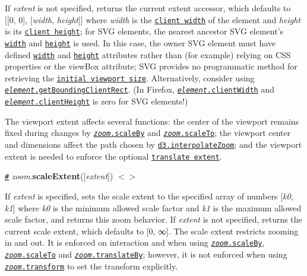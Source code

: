 If {\itshape extent} is not specified, returns the current extent accessor, which defaults to \mbox{[}\mbox{[}0, 0\mbox{]}, \mbox{[}{\itshape width}, {\itshape height}\mbox{]}\mbox{]} where {\itshape width} is the \href{https://developer.mozilla.org/en-US/docs/Web/API/Element/clientWidth}{\tt client width} of the element and {\itshape height} is its \href{https://developer.mozilla.org/en-US/docs/Web/API/Element/clientHeight}{\tt client height}; for S\+VG elements, the nearest ancestor S\+VG element’s \href{https://www.w3.org/TR/SVG/struct.html#SVGElementWidthAttribute}{\tt width} and \href{https://www.w3.org/TR/SVG/struct.html#SVGElementHeightAttribute}{\tt height} is used. In this case, the owner S\+VG element must have defined \href{https://www.w3.org/TR/SVG/struct.html#SVGElementWidthAttribute}{\tt width} and \href{https://www.w3.org/TR/SVG/struct.html#SVGElementHeightAttribute}{\tt height} attributes rather than (for example) relying on C\+SS properties or the view\+Box attribute; S\+VG provides no programmatic method for retrieving the \href{https://www.w3.org/TR/SVG/coords.html#ViewportSpace}{\tt initial viewport size}. Alternatively, consider using \href{https://developer.mozilla.org/en-US/docs/Web/API/Element/getBoundingClientRect}{\tt {\itshape element}.get\+Bounding\+Client\+Rect}. (In Firefox, \href{https://developer.mozilla.org/en-US/docs/Web/API/Element/clientWidth}{\tt {\itshape element}.client\+Width} and \href{https://developer.mozilla.org/en-US/docs/Web/API/Element/clientHeight}{\tt {\itshape element}.client\+Height} is zero for S\+VG elements!)

The viewport extent affects several functions\+: the center of the viewport remains fixed during changes by \href{#zoom_scaleBy}{\tt {\itshape zoom}.scale\+By} and \href{#zoom_scaleTo}{\tt {\itshape zoom}.scale\+To}; the viewport center and dimensions affect the path chosen by \href{https://github.com/d3/d3-interpolate#interpolateZoom}{\tt d3.\+interpolate\+Zoom}; and the viewport extent is needed to enforce the optional \href{#zoom_translateExtent}{\tt translate extent}.

\href{#zoom_scaleExtent}{\tt \#} {\itshape zoom}.{\bfseries scale\+Extent}(\mbox{[}{\itshape extent}\mbox{]}) \href{https://github.com/d3/d3-zoom/blob/master/src/zoom.js#L398}{\tt $<$$>$}

If {\itshape extent} is specified, sets the scale extent to the specified array of numbers \mbox{[}{\itshape k0}, {\itshape k1}\mbox{]} where {\itshape k0} is the minimum allowed scale factor and {\itshape k1} is the maximum allowed scale factor, and returns this zoom behavior. If {\itshape extent} is not specified, returns the current scale extent, which defaults to \mbox{[}0, ∞\mbox{]}. The scale extent restricts zooming in and out. It is enforced on interaction and when using \href{#zoom_scaleBy}{\tt {\itshape zoom}.scale\+By}, \href{#zoom_scaleTo}{\tt {\itshape zoom}.scale\+To} and \href{#zoom_translateBy}{\tt {\itshape zoom}.translate\+By}; however, it is not enforced when using \href{#zoom_transform}{\tt {\itshape zoom}.transform} to set the transform explicitly.

